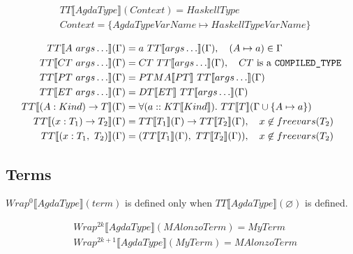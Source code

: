 \begin{align*}
   &TT\llbracket AgdaType \rrbracket(Context) = HaskellType\\
   &Context = \{ AgdaTypeVarName \mapsto HaskellTypeVarName \}
\end{align*}

\begin{align*}
   TT\llbracket A\ args\ldots \rrbracket(\Gamma) &= a\ TT\llbracket args\ldots \rrbracket(\Gamma),
      \quad (A \mapsto a) \in \Gamma \\
   TT\llbracket CT\ args\ldots \rrbracket(\Gamma) &= CT\ TT\llbracket args\ldots \rrbracket(\Gamma),
      \quad CT\text{ is a \texttt{COMPILED\_TYPE}}\\
   TT\llbracket PT\ args\ldots \rrbracket(\Gamma) &= PTMA\llbracket PT \rrbracket\ TT\llbracket args\ldots \rrbracket(\Gamma) \\
   TT\llbracket ET\ args\ldots \rrbracket(\Gamma) &= DT\llbracket ET \rrbracket \ TT\llbracket args\ldots \rrbracket(\Gamma)\\
   TT\llbracket (A : Kind) \rightarrow T \rrbracket(\Gamma) &= \forall (a :: KT\llbracket Kind \rrbracket).
      \ TT\llbracket T \rrbracket(\Gamma \cup \{A \mapsto a\})\\
   TT\llbracket (x : T_1) \rightarrow T_2 \rrbracket(\Gamma) &=
      TT\llbracket T_1 \rrbracket(\Gamma) \rightarrow TT\llbracket T_2 \rrbracket(\Gamma),
      \quad x \not\in freevars(T_2) \\
   TT\llbracket (x : T_1,\ T_2) \rrbracket(\Gamma) &=
      (TT\llbracket T_1 \rrbracket(\Gamma),\ TT\llbracket T_2 \rrbracket(\Gamma)),
      \quad x \not\in freevars(T_2) \\
\end{align*}

\subsection{Terms}

\(Wrap^0\llbracket AgdaType \rrbracket(term)\) is defined only when \(TT\llbracket AgdaType \rrbracket(\varnothing)\) is defined.

\begin{align*}
   &Wrap^{2k}\llbracket AgdaType \rrbracket(MAlonzoTerm) = MyTerm\\
   &Wrap^{2k + 1}\llbracket AgdaType \rrbracket(MyTerm) = MAlonzoTerm
\end{align*}

